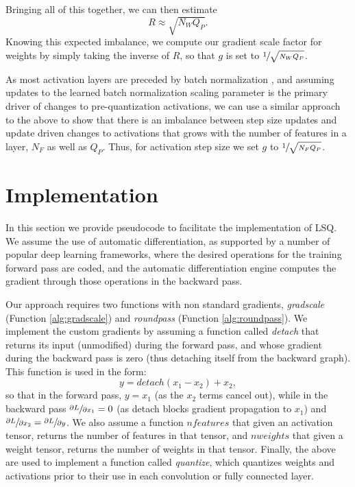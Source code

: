 \documentclass{article}
\begin{document}
Bringing all of this together, we can then estimate
\begin{equation}
R \approx \sqrt{ N_W Q_P }.
\end{equation}
Knowing this expected imbalance, we compute our gradient scale factor for weights by simply taking the inverse of $R$, so that $g$ is set to $\sfrac{1}{\sqrt{N_WQ_P}}$.

As most activation layers are preceded by batch normalization \citep{ioffe2015batch}, and assuming updates to the learned batch normalization scaling parameter is the primary driver of changes to pre-quantization activations, we can use a similar approach to the above to show that there is an imbalance between step size updates and update driven changes to activations that grows with the number of features in a layer, $N_F$ as well as $Q_P$.  Thus, for activation step size we set $g$ to $\sfrac{1}{\sqrt{N_FQ_P}}$.



\section{Implementation}

\newcommand{\algrule}[1][.2pt]{\par\vskip0.2\baselineskip\hrule height #1\par\vskip.2\baselineskip}

In this section we provide pseudocode to facilitate the implementation of LSQ.
We assume the use of automatic differentiation, as supported by a number of popular deep learning frameworks, where the desired operations for the training forward pass are coded, and the automatic differentiation engine computes the gradient through those operations in the backward pass.

Our approach requires two functions with non standard gradients, \textit{gradscale} (Function \ref{alg:gradscale}) and \textit{roundpass} (Function \ref{alg:roundpass}).
We implement the custom gradients by assuming a function called \textit{detach} that returns its input (unmodified) during the forward pass, and whose gradient during the backward pass is zero (thus detaching itself from the backward graph).
This function is used in the form:
\begin{equation}
y = detach(x_1 - x_2) + x_2,
\end{equation}
so that in the forward pass, $y=x_1$ (as the $x_2$ terms cancel out), while in the backward pass $\sfrac{\partial L}{\partial x_1} = 0$ (as detach blocks gradient propagation to $x_1$) and $\sfrac{\partial L}{\partial x_2} = \sfrac{\partial L}{\partial y}$.
We also assume a function $nfeatures$ that given an activation tensor, returns the number of features in that tensor, and $nweights$ that given a weight tensor, returns the number of weights in that tensor.
Finally, the above are used to implement a function called \textit{quantize}, which quantizes weights and activations prior to their use in each convolution or fully connected layer.
\end{document}
